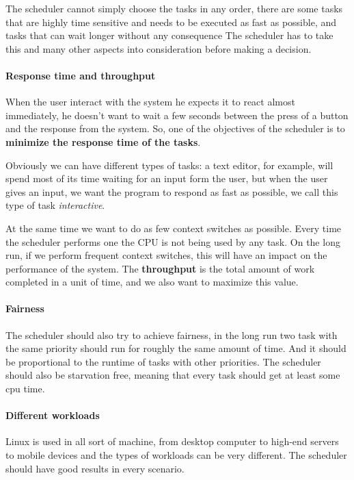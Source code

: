 \documentclass[10pt]{book}
\begin{document}


The scheduler cannot simply choose the tasks in any order, there are some tasks that are highly time sensitive and needs to be executed as fast as possible, and tasks that can wait longer without any consequence The scheduler has to take this and many other aspects into consideration before making a decision.

\paragraph{Response time and throughput}
When the user interact with the system he expects it to react almost immediately, he doesn't want to wait a few seconds between the press of a button and the response from the system. So, one of the objectives of the scheduler is to \textbf{minimize the response time of the tasks}. 

Obviously we can have different types of tasks: a text editor, for example, will spend most of its time waiting for an input form the user, but when the user gives an input, we want the program to respond as fast as possible, we call this type of task \textit{interactive}.

At the same time we want to do as few context switches as possible. Every time the scheduler performs one the CPU is not being used by any task. On the long run, if we perform frequent context switches, this will have an impact on the performance of the system. The \textbf{throughput} is the total amount of work completed in a unit of time, and we also want to maximize this value.

\paragraph{Fairness}
The scheduler should also try to achieve fairness, in the long run two task with the same priority should run for roughly the same amount of time. And it should be proportional to the runtime of tasks with other priorities. The scheduler should also be starvation free, meaning that every task should get at least some cpu time.

\paragraph{Different workloads}
Linux is used in all sort of machine, from desktop computer to high-end servers to mobile devices and the types of workloads can be very different. The scheduler should have good results in every scenario.
\end{document}
